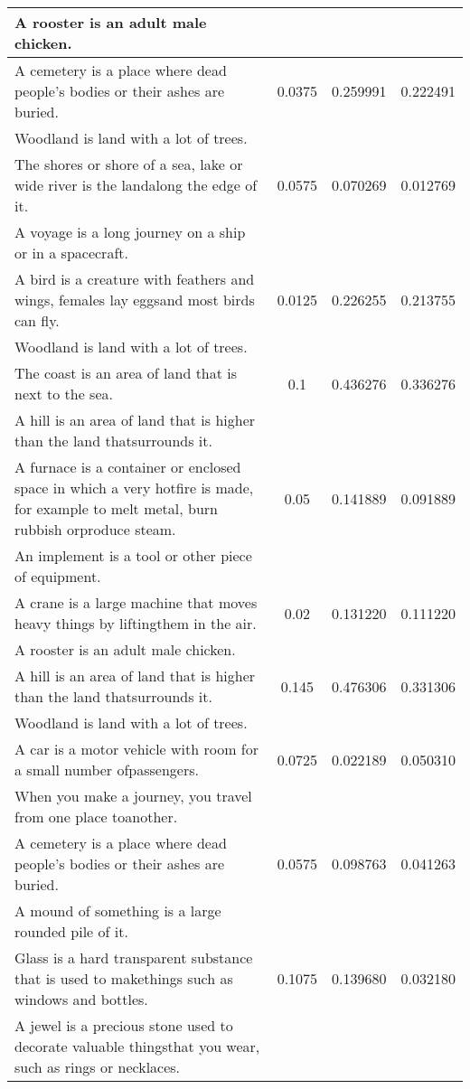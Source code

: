 \begin{center}
{\begin{longtable}{|p{9cm}|c|c|c|}
A rooster is an adult male chicken. & & & \\
\hline
A cemetery is a place where dead people's bodies or their ashes are buried. & 0.0375 & 0.259991 & 0.222491 \\
Woodland is land with a lot of trees. & & & \\
\hline
The shores or shore of a sea, lake or wide river is the landalong the edge of it. & 0.0575 & 0.070269 & 0.012769 \\
A voyage is a long journey on a ship or in a spacecraft. & & & \\
\hline
A bird is a creature with feathers and wings, females lay eggsand most birds can fly. & 0.0125 & 0.226255 & 0.213755 \\
Woodland is land with a lot of trees. & & & \\
\hline
The coast is an area of land that is next to the sea. & 0.1 & 0.436276 & 0.336276 \\
A hill is an area of land that is higher than the land thatsurrounds it. & & & \\
\hline
A furnace is a container or enclosed space in which a very hotfire is made, for example to melt metal, burn rubbish orproduce steam. & 0.05 & 0.141889 & 0.091889 \\
An implement is a tool or other piece of equipment. & & & \\
\hline
A crane is a large machine that moves heavy things by liftingthem in the air. & 0.02 & 0.131220 & 0.111220 \\
A rooster is an adult male chicken. & & & \\
\hline
A hill is an area of land that is higher than the land thatsurrounds it. & 0.145 & 0.476306 & 0.331306 \\
Woodland is land with a lot of trees. & & & \\
\hline
A car is a motor vehicle with room for a small number ofpassengers. & 0.0725 & 0.022189 & 0.050310 \\
When you make a journey, you travel from one place toanother. & & & \\
\hline
A cemetery is a place where dead people's bodies or their ashes are buried. & 0.0575 & 0.098763 & 0.041263 \\
A mound of something is a large rounded pile of it. & & & \\
\hline
Glass is a hard transparent substance that is used to makethings such as windows and bottles. & 0.1075 & 0.139680 & 0.032180 \\
A jewel is a precious stone used to decorate valuable thingsthat you wear, such as rings or necklaces. & & & \\

\end{longtable}}
\end{center}
